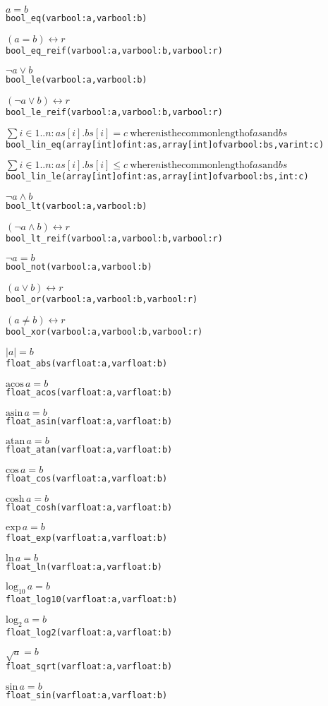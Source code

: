 \documentclass[a4paper]{article}
\begin{document}
\begin{alltt}
\(a = b\)
bool_eq(var bool: a, var bool: b)

\((a = b) \leftrightarrow r\)
bool_eq_reif(var bool: a, var bool: b, var bool: r)

\(\neg{}a \vee b\)
bool_le(var bool: a, var bool: b)

\((\neg{}a \vee b) \leftrightarrow r\)
bool_le_reif(var bool: a, var bool: b, var bool: r)

\(\sum i\in{}1..n: as[i].bs[i] = c\
\mathrm{ where} n \mathrm{is the common length of} as \mathrm{and} bs\)
bool_lin_eq(array [int] of int: as, array [int] of var bool: bs, var int: c)

\(\sum i\in{}1..n: as[i].bs[i] \le c\
\mathrm{ where} n \mathrm{is the common length of} as \mathrm{and} bs\)
bool_lin_le(array [int] of int: as, array [int] of var bool: bs, int: c)

\(\neg{}a \wedge b\)
bool_lt(var bool: a, var bool: b)

\((\neg{}a \wedge b) \leftrightarrow r\)
bool_lt_reif(var bool: a, var bool: b, var bool: r)

\(\neg{}a = b\)
bool_not(var bool: a, var bool: b)

\((a \vee b) \leftrightarrow r\)
bool_or(var bool: a, var bool: b, var bool: r)

\((a \neq b) \leftrightarrow r\)
bool_xor(var bool: a, var bool: b, var bool: r)

\(|a| = b\)
float_abs(var float: a, var float: b)

\(\mathrm{acos}\, a = b\)
float_acos(var float: a, var float: b)

\(\mathrm{asin}\, a = b\)
float_asin(var float: a, var float: b)

\(\mathrm{atan}\, a = b\)
float_atan(var float: a, var float: b)

\(\mathrm{cos}\, a = b\)
float_cos(var float: a, var float: b)

\(\mathrm{cosh}\, a = b\)
float_cosh(var float: a, var float: b)

\(\mathrm{exp}\, a = b\)
float_exp(var float: a, var float: b)
 
\(\mathrm{ln}\, a = b\)
float_ln(var float: a, var float: b)

\(\mathrm{log}_{10}\, a = b\)
float_log10(var float: a, var float: b)

\(\mathrm{log}_2\, a = b\)
float_log2(var float: a, var float: b)

\(\sqrt{a} = b\)
float_sqrt(var float: a, var float: b)

\(\mathrm{sin}\, a = b\)
float_sin(var float: a, var float: b)


\end{alltt}
\end{document}
